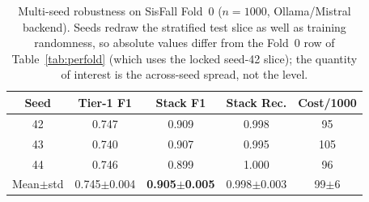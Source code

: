 \begin{table}[!t]
\centering
\caption{Multi-seed robustness on SisFall Fold~0 ($n{=}1000$, Ollama/Mistral backend). Seeds redraw the stratified test slice as well as training randomness, so absolute values differ from the Fold~0 row of Table~\ref{tab:perfold} (which uses the locked seed-42 slice); the quantity of interest is the across-seed spread, not the level.}
\label{tab:seeds}
\begin{tabular}{ccccc}
\toprule
Seed & Tier-1 F1 & Stack F1 & Stack Rec. & Cost/1000 \\
\midrule
42 & 0.747 & 0.909 & 0.998 & 95 \\
43 & 0.740 & 0.907 & 0.995 & 105 \\
44 & 0.746 & 0.899 & 1.000 & 96 \\
\midrule
Mean$\pm$std & 0.745$\pm$0.004 & \textbf{0.905$\pm$0.005} & 0.998$\pm$0.003 & 99$\pm$6 \\
\bottomrule
\end{tabular}
\end{table}
